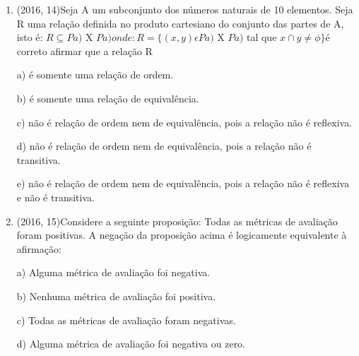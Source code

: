 \documentclass{article}
\begin{document}
\begin{enumerate}
4. $p \rightarrow (q \lor r) \land \sim( q \lor r)$ DM(3)

5. $\sim p \lor (q \lor r) \land \sim(q \lor r)$ COND(4)

6. $\sim p $ EN(5) \newline

e) Daniel não fala dinamarquês

\textbf{CONTEÚDO}

$\rule[1cm]{100cm}{1px}$

elemento neutro(EN) $\phi \wedge(\psi \vee \neg \psi) \equiv \phi$

condicional(COND) $\phi \rightarrow \psi \equiv \sim \phi \vee \psi$

DeMorgan(DM) $\sim(\phi \wedge \psi) \equiv \sim \phi \vee \sim \psi$ 

\newpage




\item (2016, 14)Seja A um subconjunto dos números naturais de 10 elementos. Seja R uma relação
definida no produto cartesiano do conjunto das partes de A, isto é: $R \subseteq  Pa)$ X $Pa) onde: R = \{(x, y) \epsilon Pa)$ X $Pa)$ tal que $x \cap y \ne \phi \} $é correto afirmar que a relação R\newline

a) é somente uma relação de ordem.

b) é somente uma relação de equivalência.

c) não é relação de ordem nem de equivalência, pois a relação não é reflexiva.

d) não é relação de ordem nem de equivalência, pois a relação não é transitiva.

e) não é relação de ordem nem de equivalência, pois a relação não é reflexiva e não é transitiva.\newline


\newpage

\item (2016, 15)Considere a seguinte proposição: Todas as métricas de avaliação foram positivas.
A negação da proposição acima é logicamente equivalente à afirmação:\newline

a) Alguma métrica de avaliação foi negativa.

b) Nenhuma métrica de avaliação foi positiva.

c) Todas as métricas de avaliação foram negativas.

d) Alguma métrica de avaliação foi negativa ou zero.


\end{enumerate}
\end{document}
